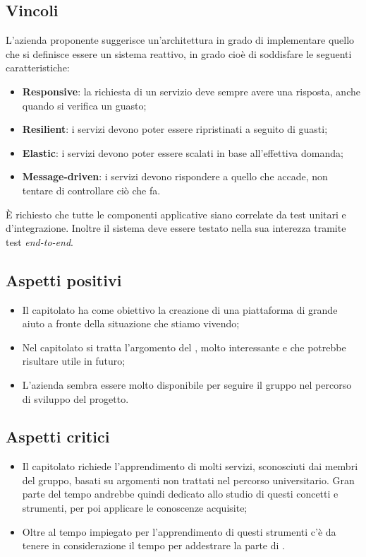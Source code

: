 \subsection{Vincoli}
L'azienda proponente suggerisce un'architettura in grado di implementare quello che si definisce essere un sistema reattivo, in grado cioè di soddisfare le seguenti caratteristiche: 
\begin{itemize}
\item \textbf{Responsive}: la richiesta di un servizio deve sempre avere una risposta, anche quando si verifica un guasto; 
\item \textbf{Resilient}: i servizi devono poter essere ripristinati a seguito di guasti; 
\item \textbf{Elastic}: i servizi devono poter essere scalati in base all'effettiva domanda; 
\item \textbf{Message-driven}: i servizi devono rispondere a quello che accade, non tentare di controllare ciò che fa.  
\end{itemize}
È richiesto che tutte le componenti applicative siano correlate da test unitari e d'integrazione. Inoltre il sistema deve essere testato nella sua interezza tramite test \textit{end-to-end}. 

\subsection{Aspetti positivi}
\begin{itemize}
\item Il capitolato ha come obiettivo la creazione di una piattaforma di grande aiuto a fronte della situazione che stiamo vivendo;
\item Nel capitolato si tratta l'argomento del , molto interessante e che potrebbe risultare utile in futuro;
\item L'azienda sembra essere molto disponibile per seguire il gruppo nel percorso di sviluppo del progetto.
\end{itemize}

\subsection{Aspetti critici}
\begin{itemize}
\item Il capitolato richiede l'apprendimento di molti servizi, sconosciuti dai membri del gruppo, basati su argomenti non trattati nel percorso universitario. Gran parte del tempo andrebbe quindi dedicato allo studio di questi concetti e strumenti, per poi applicare le conoscenze acquisite;
\item Oltre al tempo impiegato per l'apprendimento di questi strumenti c'è da tenere in considerazione il tempo per addestrare la parte di .
\end{itemize}


